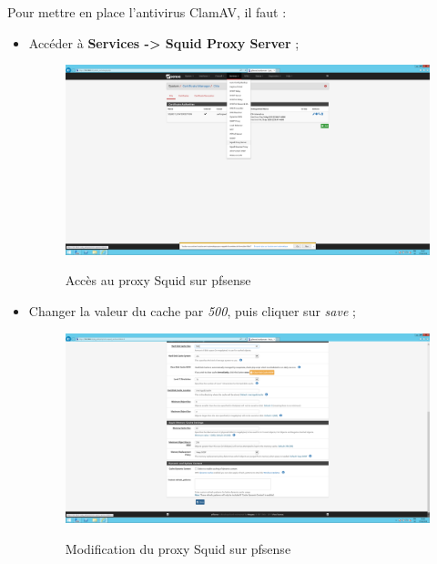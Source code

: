 Pour mettre en place l'antivirus ClamAV, il faut :
\begin{itemize}
\item Accéder à \textbf{Services -> Squid Proxy Server} ;
\begin{figure}[h!]
    \begin{center}
        \includegraphics[scale=0.20]{Pfsense_Screeshots/interception/11.png}
        \label{Pfsense_Screeshots/interception/11}
        \caption{Accès au proxy Squid sur pfsense}
    \end{center}
\end{figure}
\FloatBarrier 
    
\item Changer la valeur du cache par \textit{500}, puis cliquer sur \textit{save} ;
\begin{figure}[h!]
    \begin{center}
        \includegraphics[scale=0.20]{Pfsense_Screeshots/interception/12.png}
        \label{Pfsense_Screeshots/interception/12}
        \caption{Modification du proxy Squid sur pfsense}
    \end{center}
\end{figure}
\FloatBarrier 
    

\end{itemize}

